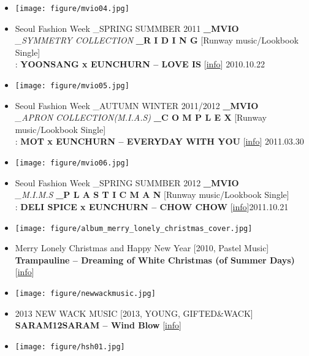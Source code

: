 \begin{itemize}
\item \texttt{[image: figure/mvio04.jpg]}
\item Seoul Fashion Week \_SPRING SUMMBER 2011 \textbf{\_MVIO}\\ \textit{\_SYMMETRY COLLECTION} \textbf{\_R I D I N G} [Runway music/Lookbook Single]\\: \textbf{YOONSANG x EUNCHURN – LOVE IS} [\href{http://www.eunchurn.com/2010/10/23/yoonsang-x-eunchurn-love-is-music-for-mvio-by-hansanghyuk-2011-ss-collection/}{\footnotesize{info}}] \hfill 2010.10.22
\item \texttt{[image: figure/mvio05.jpg]}
\item Seoul Fashion Week \_AUTUMN WINTER 2011/2012 \textbf{\_MVIO}\\ \textit{\_APRON COLLECTION(M.I.A.S)} \textbf{\_C O M P L E X} [Runway music/Lookbook Single]\\: \textbf{MOT x EUNCHURN – EVERYDAY WITH YOU} [\href{http://www.eunchurn.com/2011/03/20/_mvio-by-hansanghyuk-seoul-fashion-week-fw-20112012/}{\footnotesize{info}}] \hfill 2011.03.30
\item \texttt{[image: figure/mvio06.jpg]}
\item Seoul Fashion Week \_SPRING SUMMBER 2012 \textbf{\_MVIO}\\ \textit{\_M.I.M.S} \textbf{\_P L A S T I C M A N} [Runway music/Lookbook Single]\\: \textbf{DELI SPICE x EUNCHURN – CHOW CHOW} [\href{http://www.eunchurn.com/2011/10/20/mvio_haan-sang-hyuk_-p-l-a-s-t-i-c-m-a-n-spring-summer-2012/}{\footnotesize{info}}]\hfill 2011.10.21
\item \texttt{[image: figure/album\_merry\_lonely\_christmas\_cover.jpg]}
\item Merry Lonely Christmas and Happy New Year [2010, Pastel Music] \textbf{Trampauline – Dreaming of White Christmas (of Summer Days)} [\href{http://music.naver.com/album/index.nhn?albumId=184204}{\footnotesize{info}}]
\item \texttt{[image: figure/newwackmusic.jpg]}
\item 2013 NEW WACK MUSIC [2013, YOUNG, GIFTED\&WACK] \textbf{SARAM12SARAM – Wind Blow} [\href{https://soundcloud.com/younggiftedwack/2013-new-wack-music-highlight}{\footnotesize{info}}]
\item \texttt{[image: figure/hsh01.jpg]}

\end{itemize}
